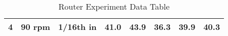 \begin{table}[]
\begin{tabular}{lcc|r|r|r|r|r}
\multicolumn{1}{|l|}{4}                                                            & \multicolumn{1}{c|}{90 rpm}                                                            & 1/16th in             & 41.0                            & 43.9                            & 36.3                            & 39.9                            & \multicolumn{1}{r|}{40.3}                                                              \\ \hline
\end{tabular}\caption{Router Experiment Data Table}\label{RouterData}
\end{table}